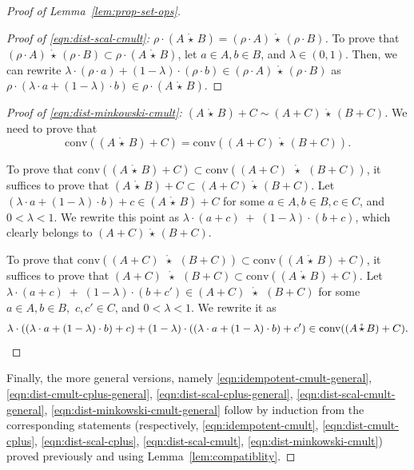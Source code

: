 \documentclass[10pt]{amsart}
\theoremstyle{plain}
\theoremstyle{definition}
\providecommand{\cmult}[0]{\ensuremath{{\,\mathring{\star}\,}}\xspace}
\providecommand{\conv}[1]{\ensuremath{\mathrm{conv}{\left({#1}\right)}\xspace}}
\begin{document}
\begin{proof}[Proof of Lemma~\ref{lem:prop-set-ops}]
\begin{proof}[Proof of \eqref{eqn:dist-scal-cmult}: $\rho\cdot (A\cmult B) = (\rho\cdot A) \cmult(\rho\cdot B)$]
To prove that $(\rho\cdot A) \cmult (\rho\cdot B)\subset \rho\cdot (A\cmult B)$, let $a\in A, b\in B$, and $\lambda\in (0,1)$. Then, we can rewrite  $\lambda\cdot (\rho\cdot a)+(1-\lambda)\cdot (\rho\cdot b)\in (\rho\cdot A) \cmult (\rho\cdot B)$ as $\rho\cdot (\lambda\cdot a+(1-\lambda)\cdot b)\in \rho\cdot (A \cmult B)$.
\end{proof}


\begin{proof}[Proof of \eqref{eqn:dist-minkowski-cmult}: $(A\cmult B) + C \sim (A+C)\cmult(B+C)$]
    We need to prove that 
    \[
    \conv{(A\cmult B) + C} = \conv{(A+C)\cmult(B+C)}.
    \]
    
 To prove that $\conv{(A\cmult B) + C}\subset \conv{(A+C)\;\cmult\;(B+C)}$,
it suffices to prove that $(A\cmult B) + C \subset (A+C) \cmult (B+C)$.
Let $(\lambda\cdot a + (1-\lambda)\cdot b) + c \in \left(A\cmult B\right) + C$ for some $a\in A, b\in B, c\in C$, and $0<\lambda<1$. 
    We rewrite this point as $\lambda\cdot(a+c) \;+\; (1-\lambda)\cdot(b+c)$, which clearly belongs to $(A+C) \cmult (B+C)$.
    
    
   To prove that $\conv{(A+C)\;\cmult\;(B+C)}\subset \conv{(A\cmult B) + C}$,
    it suffices to prove that $(A+C)\;\cmult\;(B+C) \subset \conv{(A\cmult B) + C}$.
    Let $\lambda\cdot(a+c) \;+\; (1-\lambda)\cdot (b+c')\in (A+C)\;\cmult\;(B+C)$ for some $a\in A, b\in B,$  $c,c'\in C$, and $0<\lambda<1$. We
    rewrite it as $$\lambda\cdot\left((\lambda\cdot a+(1-\lambda)\cdot b)+c\right)+(1-\lambda)\cdot \left((\lambda\cdot a+(1-\lambda)\cdot b)+c'\right)\in \conv{(A\cmult B) + C}. \qedhere$$
\end{proof}
Finally, the more general versions, namely 
\eqref{eqn:idempotent-cmult-general}, \eqref{eqn:dist-cmult-cplus-general}, \eqref{eqn:dist-scal-cplus-general},
\eqref{eqn:dist-scal-cmult-general},
\eqref{eqn:dist-minkowski-cmult-general}
follow by induction from the corresponding statements 
(respectively, \eqref{eqn:idempotent-cmult}, \eqref{eqn:dist-cmult-cplus}, \eqref{eqn:dist-scal-cplus},
\eqref{eqn:dist-scal-cmult},
\eqref{eqn:dist-minkowski-cmult}) proved previously and using Lemma~\ref{lem:compatiblity}.
\end{proof}
\end{document}
